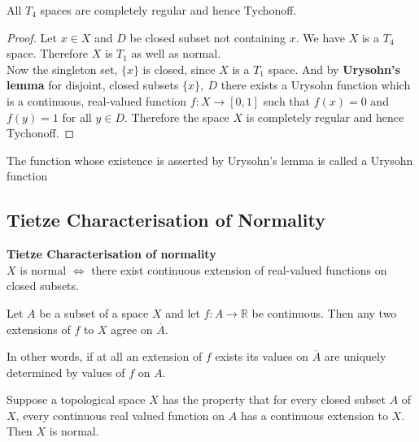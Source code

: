 \begin{corollary}
	All \( T_4 \) spaces are completely regular and hence Tychonoff.
\end{corollary}
\begin{proof}
	Let \( x \in X \) and \( D \) be closed subset not containing \( x \).
	We have \( X \) is a \( T_4 \) space.
	Therefore \( X \) is \( T_1 \) as well as normal.\\

	Now the singleton set, \( \{ x \} \) is closed, since \( X \) is a \( T_1 \) space.
	And by \textbf{Urysohn's lemma} for disjoint, closed subsets \( \{ x \},\ D \) there exists a Urysohn function which is a continuous, real-valued function \( f : X \to [0,1] \) such that \( f(x) = 0 \) and \( f(y) = 1 \) for all \( y \in D \).
	Therefore the space \( X \) is completely regular and hence Tychonoff.
\end{proof}

\begin{remark}
	The function whose existence is asserted by Urysohn's lemma is called a Urysohn function
\end{remark}

\subsection{Tietze Characterisation of Normality}
\begin{important}
	\textbf{Tietze Characterisation of normality}\\
	$X$ is normal $\iff$ there exist continuous extension of real-valued functions on closed subsets. 
\end{important}
\begin{proposition}
	Let \( A \) be a subset of a space \( X \) and let \( f : A \to \mathbb{R} \) be continuous.
	Then any two extensions of \( f \) to \( X \) agree on \( \overline{A} \).
	\begin{commentary}
		In other words, if at all an extension of \( f \) exists its values on \( \overline{A} \) are uniquely determined by values of \( f \) on \( A \).
	\end{commentary}
\end{proposition}

\begin{proposition}
	Suppose a topological space \( X \) has the property that for every closed subset \( A \) of \( X \), every continuous real valued function on \( A \) has a continuous extension to \( X \).
	Then \( X \) is normal.
\end{proposition}

